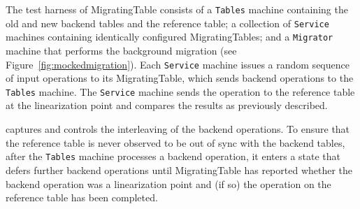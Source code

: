 
The \psharp test harness of MigratingTable consists of a \texttt{Tables} machine containing the old and new backend tables and the reference table; a collection of \texttt{Service} machines containing identically configured MigratingTables; and a \texttt{Migrator} machine that performs the background migration (see Figure~\ref{fig:mockedmigration}). Each \texttt{Service} machine issues a random sequence of input operations to its MigratingTable, which sends backend operations to the \texttt{Tables} machine. The \texttt{Service} machine sends the operation to the reference table at the linearization point and compares the results as previously described.

\psharp captures and controls the interleaving of the backend operations. To ensure that the reference table is never observed to be out of sync with the backend tables, after the \texttt{Tables} machine processes a backend operation, it enters a state that defers further backend operations until MigratingTable has reported whether the backend operation was a linearization point and (if so) the operation on the reference table has been completed.



